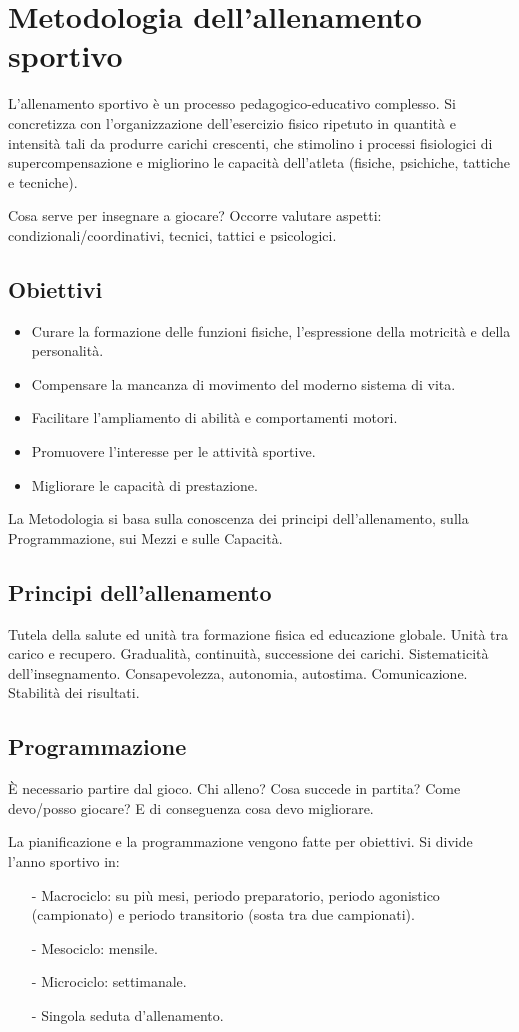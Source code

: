 \chapter{Metodologia dell'allenamento sportivo}

L'allenamento sportivo è un processo pedagogico-educativo complesso. Si concretizza con l'organizzazione dell'esercizio fisico ripetuto in quantità e intensità tali da produrre carichi crescenti, che stimolino i processi fisiologici di supercompensazione e migliorino le capacità dell'atleta (fisiche, psichiche, tattiche e tecniche).

Cosa serve per insegnare a giocare?
Occorre valutare aspetti: condizionali/coordinativi, tecnici, tattici e psicologici.

\section{Obiettivi}
\begin{itemize}
\item Curare la formazione delle funzioni fisiche, l'espressione della motricità e della personalità.
\item Compensare la mancanza di movimento del moderno sistema di vita.
\item Facilitare l'ampliamento di abilità e comportamenti motori.
\item Promuovere l'interesse per le attività sportive.
\item Migliorare le capacità di prestazione.
\end{itemize}

La Metodologia si basa sulla conoscenza dei principi dell'allenamento, sulla Programmazione, sui Mezzi e sulle Capacità.

\section{Principi dell'allenamento}
Tutela della salute ed unità tra formazione fisica ed educazione globale.
Unità tra carico e recupero.
Gradualità, continuità, successione dei carichi.
Sistematicità dell'insegnamento.
Consapevolezza, autonomia, autostima.
Comunicazione.
Stabilità dei risultati.


\section{Programmazione}
\`E necessario partire dal gioco. Chi alleno? Cosa succede in partita? Come devo/posso giocare? E di conseguenza cosa devo migliorare.
\begin{ross}
La pianificazione e la programmazione vengono fatte per obiettivi. Si divide
l'anno sportivo in:
\begin{enumerate}
\item[-]Macrociclo: su più mesi, periodo preparatorio, periodo agonistico
(campionato) e periodo transitorio (sosta tra due campionati).
\item[-]Mesociclo: mensile.
\item[-]Microciclo: settimanale.
\item[-]Singola seduta d'allenamento.
\end{enumerate}
\end{ross}

